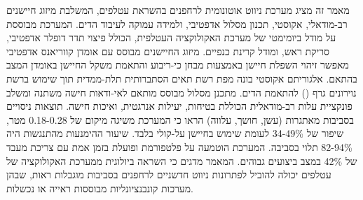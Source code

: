 


מאמר זה מציג מערכת ניווט אוטונומית לרחפנים בהשראת עטלפים, המשלבת מיזוג חיישנים רב-מודאלי,  אקוסטי, תכנון מסלול אדפטיבי, ולמידה עמוקה לעיבוד הדים. המערכת מבוססת על מודל ביומימטי של מערכת האקולוקציה העטלפית, הכולל פיצוי תדר דופלר אדפטיבי, סריקת ראש, ומודל קרינת כנפיים. מיזוג החיישנים מבוסס  עם אומדן קווריאנס אדפטיבי מאפשר זיהוי השפלת חיישן באמצעות מבחן כי-ריבוע והתאמת משקל החיישן באומדן המצב בהתאם. אלגוריתם  אקוסטי בונה מפת רשת תאים הסתברותית תלת-ממדית תוך שימוש ברשת נוירונים גרף () להתאמת הדים. מתכנן מסלול מבוסס  מותאם לאי-ודאות חישה משתנה ומשלב פונקציית עלות רב-מודאלית הכוללת בטיחות, יעילות אנרגטית, ואיכות חישה. תוצאות ניסויים בסביבות מאתגרות (עשן, חושך, עלווה) הראו כי המערכת משיגה  מיקום של 0.18-0.28 מטר, שיפור של 34-49\% לעומת שימוש בחיישן על-קולי בלבד. שיעור ההימנעות מהתנגשות היה 82-94\% תלוי בסביבה. המערכת הוטמעה על פלטפורמת  ופועלת בזמן אמת עם צריכת מעבד של 42\% במצב ביצועים גבוהים. המאמר מדגים כי השראה ביולוגית ממערכת האקולוקציה של עטלפים יכולה להוביל לפתרונות ניווט חדשניים לרחפנים בסביבות מוגבלות ראות, שבהן מערכות קונבנציונליות מבוססות ראייה או  נכשלות.


